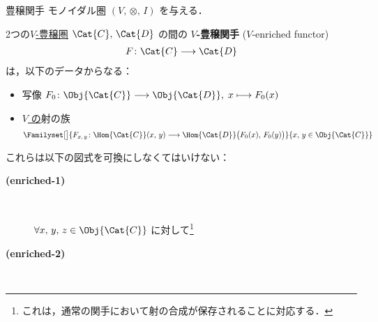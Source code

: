 \documentclass[TQFT_main]{subfiles}
\begin{document}
\begin{mydef}[label=def:enriched-functor,breakable]{豊穣関手}
    モノイダル圏 $(V,\, \otimes,\, I)$ を与える．

    2つの\hyperref[def:enriched]{$V$-豊穣圏} $\Cat{C},\, \Cat{D}$ の間の $V$\textbf{-豊穣関手} ($V$-enriched functor) 
    \begin{align}
        F \colon \Cat{C} \lto \Cat{D}
    \end{align}
    は，以下のデータからなる：
    \begin{itemize}
        \item 写像 $F_0\colon \Obj{\Cat{C}} \lto \Obj{\Cat{D}},\; x \lmto F_0(x)$
        \item \underline{$V$ の}射の族
        \begin{align}
            \Familyset[\big]{F_{x,\, y} \colon \Hom{\Cat{C}} (x,\, y) \lto \Hom{\Cat{D}} \bigl( F_0(x),\, F_0(y) \bigr) }{x,\, y \in \Obj{\Cat{C}}}
        \end{align}
    \end{itemize}
    これらは以下の図式を可換にしなくてはいけない：
    \begin{description}
        \item[\textbf{(enriched-1)}]　
        
        $\forall x,\, y,\, z \in \Obj{\Cat{C}}$ に対して\footnote{これは，通常の関手において射の合成が保存されることに対応する．}
        \begin{center}
        \end{center}
        \item[\textbf{(enriched-2)}]　
        

\end{description}
\end{mydef}
\end{document}
